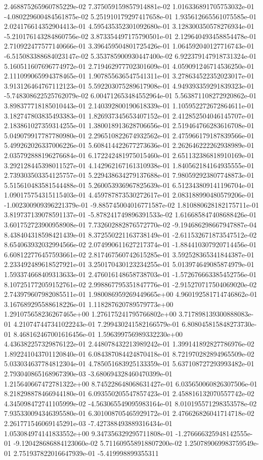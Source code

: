 	2.468875265960785229e-02	7.375059159857914881e-02	1.016336891705753032e-01	-4.080229600484561875e-02	5.251910179297417658e-01	1.935612665561075585e-01	2.024176614352904413e-01	4.595435352301092680e-01	3.128300350578276934e-01	-5.210176143284860756e-02	3.873354497175790501e-01	2.129640493458854478e-01	2.710922477577140666e-01	3.396459504801725426e-01	1.064592040127716743e-01	-6.515083388684023147e-02	5.353785900930447400e-02	6.922379147918731324e-01	5.160511607696774972e-01	2.719462977702301609e-01	4.059091246714536250e-01	2.111099065994378465e-01	1.907855636547541311e-01	3.278634522352023017e-01	3.913126464767112123e-01	5.592203075289617908e-01	4.949393359291839323e-01	-5.748308622525762079e-02	6.004712653484552964e-01	5.563871108272920862e-01	3.898377718185010443e-01	2.140392800190618339e-01	1.105952272672864611e-01	3.182747803835493383e-01	1.826937345653407152e-01	2.412852504046145707e-01	2.183861027359314255e-01	1.380018913628706656e-01	2.519464766283616708e-01	5.049079917787780980e-01	2.296510822674932562e-01	2.475966179187839566e-01	5.499262026337006226e-01	5.608414422677273636e-01	2.262646222262938989e-01	2.035792888196276684e-01	6.172242481975015460e-01	2.651132386818910169e-01	3.292128445398011527e-01	4.142962167161310938e-01	1.840562184164935555e-01	2.739303503354125757e-01	5.229438634279137688e-01	7.980592923807748873e-01	5.515610483581544488e-01	5.260053936967825639e-01	6.512343809141196704e-01	1.090175754315115403e-01	4.459787873530272617e-01	2.083188990480579206e-01	-1.002300909396221379e-01	-9.885745004016771587e-02	1.810880628182175711e-01	3.819737139078591137e-01	-5.878241749896391533e-02	1.616685847408688426e-01	3.601752723900958908e-01	7.732602882876572770e-02	-9.194686298667947887e-04	8.438404318598421439e-01	8.372550221163738149e-01	-2.611532671873547512e-02	8.654063932032994566e-02	2.074990611627217374e-01	-1.884410307920714456e-01	6.608122776457593661e-02	2.817467560742615285e-01	3.592528365341844387e-01	2.233492489618527921e-01	3.250170430123234255e-01	5.013974649085874979e-01	1.593374668409313633e-01	2.476016148658738703e-01	-1.572676663385452756e-01	8.107251772059152761e-02	2.998867795351847776e-01	-2.915270717504069020e-02	2.743979607982085511e-01	1.980086959269449665e+00	4.960192581714746862e-01	3.167689295588618226e-01	1.118287620789579773e+00	1.291075658236267465e+00	1.276175241795766802e+00	3.717898139300888083e-01	4.210747447341022243e-01	7.299430241582166579e-01	6.808045815848273730e-01	8.468162467001616456e-01	1.596399756989332230e+00	4.436382257329876122e-01	2.448078432213989242e-01	1.399141892827786976e-02	1.892241043701120840e-01	6.084387084424870418e-01	8.721970282894965509e-02	5.033034637784812304e-01	4.785051683925133359e-01	5.637108727293993482e-01	2.793040865168967390e-03	-3.680694328460470399e-01	1.215640667472781322e+00	8.745228648068631427e-01	6.035650060826307506e-01	8.218298878466944180e-01	6.093550205547857423e-01	2.458816132070557742e-02	4.345098472741105999e-02	-4.563065549095983164e-01	8.010195571298353578e-02	7.935330094346395580e-01	6.301008705465929172e-01	2.476626826041714718e-02	2.261771546069145291e-03	-7.427388493889316434e-01	1.053084974141833552e+00	9.347356329295711808e-01	-1.276666325948142555e-01	-9.120428686884123060e-02	5.711609558918807200e-02	1.250789069983759549e-01	2.751937822016647939e-01	-5.419998899355311